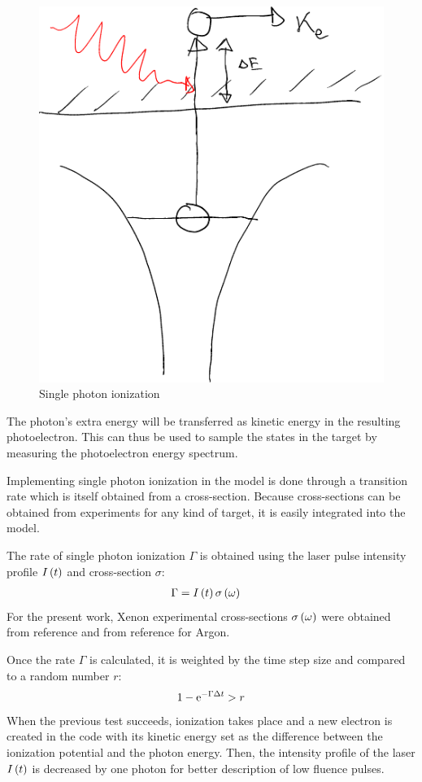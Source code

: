 \begin{figure}
 \centering
 \includegraphics[width=0.38\columnwidth]{figures/mockups/ionization_single}
 \caption{Single photon ionization}
 \label{fig:ionization:single}
\end{figure}


The photon's extra energy will be transferred as kinetic energy in the
resulting photoelectron. This can thus be used to sample the states in the
target by measuring the photoelectron energy spectrum\cite{Fennel2010}.

Implementing single photon ionization in the model is done through a
transition rate which is itself obtained from a cross-section. Because
cross-sections can be obtained from experiments for any kind of target, it is
easily integrated into the model.

The rate of single photon ionization $\Gamma$ is obtained using the laser
pulse intensity profile $I\left( t \right)$ and cross-section $\sigma$:
\begin{align}
\Gamma & = I\left( t \right) \sigma\left( \omega \right)
\end{align}
For the present work, Xenon experimental cross-sections $\sigma\left( \omega \right)$
were obtained from reference \cite{West1978} and from reference
\cite{Marr1976} for Argon.

Once the rate $\Gamma$ is calculated, it is weighted\cite{Lax2006} by the time
step size and compared to a random number $r$:
\begin{align}
1 - \textrm{e}^{-\Gamma \Delta t} > r
\end{align}
When the previous test succeeds, ionization takes place and a new electron is
created in the code with its kinetic energy set as the difference between the
ionization potential and the photon energy. Then, the intensity profile of the
laser $I\left( t \right)$ is decreased by one photon for better description of low fluence
pulses.





